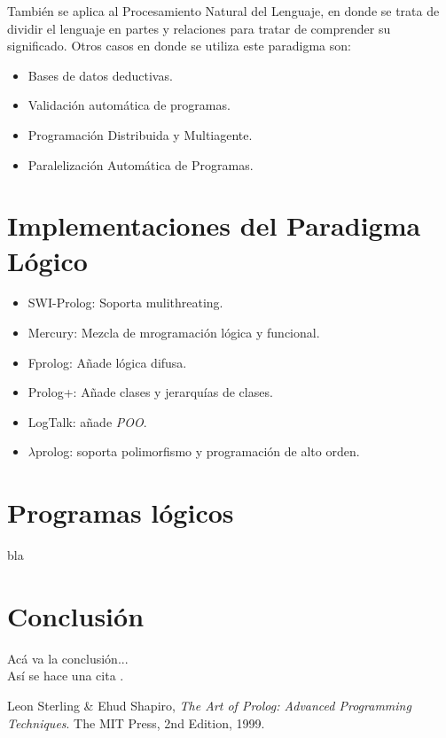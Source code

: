 \documentclass[12pt,titlepage]{report}
\begin{document}
También se aplica al Procesamiento Natural del Lenguaje, en donde se trata de dividir el lenguaje en partes y relaciones para tratar de comprender su significado.
Otros casos en donde se utiliza este paradigma son: \\
\begin{itemize}
    \item Bases de datos deductivas.
    \item Validación automática de programas.
    \item Programación Distribuida y Multiagente.
    \item Paralelización Automática de Programas.
\end{itemize}

\section{Implementaciones del Paradigma Lógico}

\begin{itemize}
    \item SWI-Prolog: Soporta mulithreating.
    \item Mercury: Mezcla de mrogramación lógica y funcional.
    \item Fprolog: Añade lógica difusa.
    \item Prolog+: Añade clases y jerarquías de clases.
    \item LogTalk: añade \textit{POO}.
    \item $\lambda$prolog: soporta polimorfismo y programación de alto orden.
\end{itemize}

\section{Programas lógicos}
bla

\section{Conclusión}
Acá va la conclusión... \\
Así se hace una cita \cite{artofprolog}.
	
\clearpage
\begin{thebibliography}{9}
   Leon Sterling \& Ehud Shapiro, \emph{The Art of Prolog: Advanced Programming Techniques}. The MIT Press, 2nd Edition, 1999.
\end{thebibliography}

\end{document}
